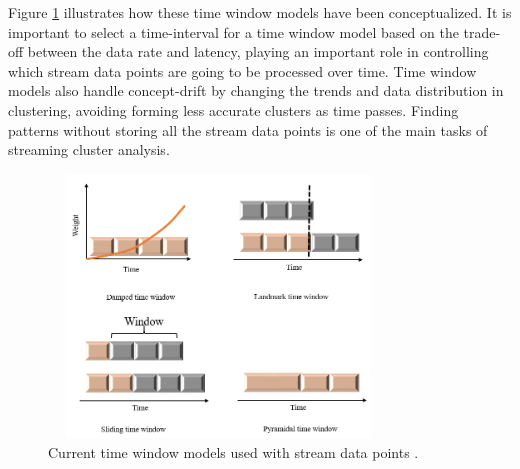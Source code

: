 Figure   \ref{time1} illustrates how these time window models have been conceptualized. It is important to select a time-interval for a time window model based on the trade-off between the data rate and latency, playing an important role in controlling which stream data points are going to be processed over time. Time window models also handle concept-drift by changing the trends and data distribution in clustering, avoiding forming less accurate clusters as time passes. Finding patterns without storing all the stream data points is one of the main tasks of streaming cluster analysis.


\begin{figure}[!h]
\centering
\includegraphics[width = 9cm,height = 7cm]{image/timeW.PNG}
\caption{Current time window models used with stream data points \protect\cite{carnein2019optimizing}.}
\label{time1}
\end{figure}



